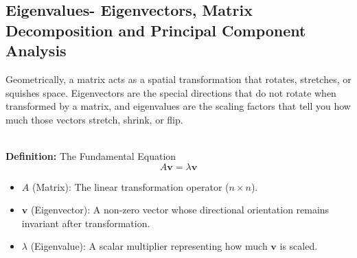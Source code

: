 \documentclass[DIV=20,oneside]{scrartcl}
\newcommand{\deff}{
	\noindent\textbf{\\Definition: }
}
\begin{document}
\begin{itemize}
	\section{Eigenvalues- Eigenvectors, Matrix Decomposition and Principal Component Analysis}
	Geometrically, a matrix acts as a spatial transformation that rotates, stretches, or squishes space. Eigenvectors are the special directions that do not rotate when transformed by a matrix, and eigenvalues are the scaling factors that tell you how much those vectors stretch, shrink, or flip.
	\deff The Fundamental Equation$$A \mathbf{v} = \lambda \mathbf{v}$$
	\begin{itemize}
		\item $A$ (Matrix): The linear transformation operator ($n \times n$).
		\item $\mathbf{v}$ (Eigenvector): A non-zero vector whose directional orientation remains invariant after transformation.
		\item $\lambda$ (Eigenvalue): A scalar multiplier representing how much $\mathbf{v}$ is scaled.
	\end{itemize}
	

\end{itemize}
\end{document}
